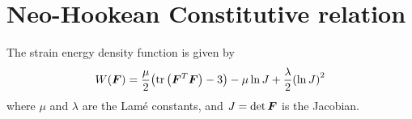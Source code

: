 \pagestyle{fancy}
\setlength{\headheight}{16pt}
\fancyhead{} %
\fancyfoot{} %
\fancyfoot[C]{\thepage}



\section{Neo-Hookean Constitutive relation}
The strain energy density function is given by
\begin{equation}
    W(\bm{F}) = \frac{\mu}{2} {\left( \textrm{tr} \left( \bm{F}^T \bm{F} \right) - 3 \right)} - \mu \ln J + \frac{\lambda}{2} {(\ln J)}^2
\end{equation}
where $\mu$ and $\lambda$ are the Lam\'{e} constants, and $J = \det{\ensuremath{\bm{F}}}$ is the Jacobian.

